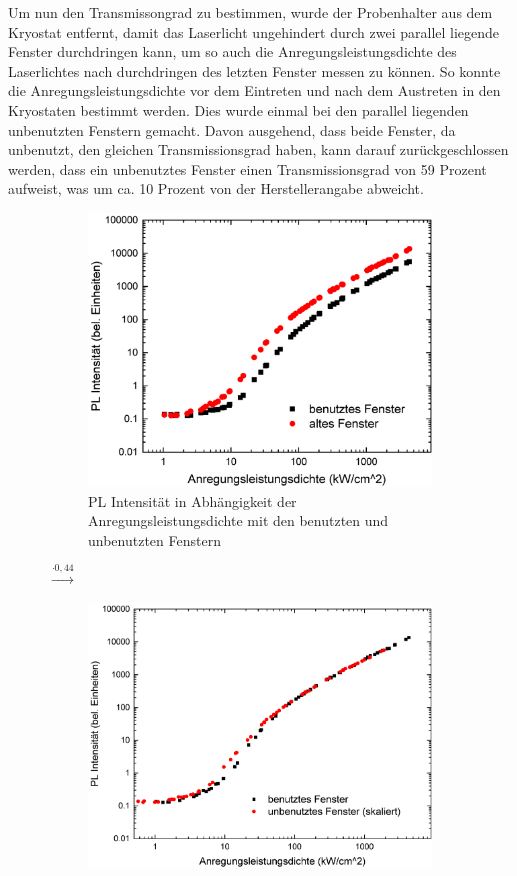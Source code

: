 Um nun den Transmissongrad zu bestimmen, wurde der Probenhalter aus dem Kryostat entfernt, damit das Laserlicht ungehindert durch zwei parallel liegende Fenster durchdringen kann, um so auch die Anregungsleistungsdichte des Laserlichtes nach durchdringen des letzten Fenster messen zu können. So konnte die Anregungsleistungsdichte vor dem Eintreten und nach dem Austreten in den Kryostaten bestimmt werden. 
Dies wurde einmal bei den parallel liegenden unbenutzten Fenstern gemacht. Davon ausgehend, dass beide Fenster, da unbenutzt, den gleichen Transmissionsgrad haben, kann darauf zurückgeschlossen werden, dass ein unbenutztes Fenster einen Transmissionsgrad von 59 Prozent aufweist, was um ca. 10 Prozent von der Herstellerangabe abweicht. 
%
\begin{figure}[htb]
  \centering
  \begin{subfigure}{0.40\textwidth}
    \centering
    \includegraphics[width=0.9\linewidth]{Bilder/uvsilicavergleich.pdf}
    \caption{PL Intensität in Abhängigkeit der Anregungsleistungsdichte mit den benutzten und unbenutzten Fenstern}
    \label{fig:sub1}
  \end{subfigure}%
  {\LARGE$\xrightarrow{\cdot 0,44}$}
  \begin{subfigure}{0.40\textwidth}
    \centering
    \includegraphics[width=0.9\linewidth]{Bilder/uvsilicaVergleichSkaliert.pdf}

\end{subfigure}
\end{figure}
